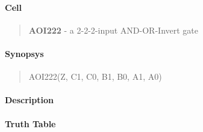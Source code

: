 \label{AOI222}
\paragraph{Cell}
\begin{quote}
    \textbf{AOI222} - a 2-2-2-input AND-OR-Invert gate
\end{quote}

\paragraph{Synopsys}
\begin{quote}
    AOI222(Z, C1, C0, B1, B0, A1, A0)
\end{quote}

\paragraph{Description}



\paragraph{Truth Table}


